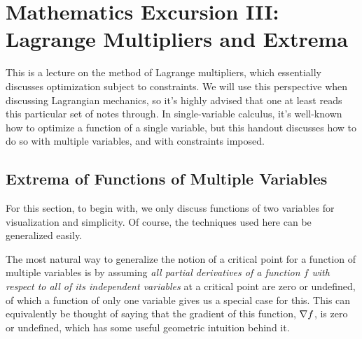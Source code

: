\section{Mathematics Excursion III: Lagrange Multipliers and Extrema}

This is a lecture on the method of Lagrange multipliers, which essentially discusses optimization subject to constraints. We will use this perspective when discussing Lagrangian mechanics, so it's highly advised that one at least reads this particular set of notes through. In single-variable calculus, it's well-known how to optimize a function of a single variable, but this handout discusses how to do so with multiple variables, and with constraints imposed. 

\subsection{Extrema of Functions of Multiple Variables}
For this section, to begin with, we only discuss functions of two variables for visualization and simplicity. Of course, the techniques used here can be generalized easily. 

The most natural way to generalize the notion of a critical point for a function of multiple variables is by assuming \textit{all partial derivatives of a function $f$ with respect to all of its independent variables} at a critical point are zero or undefined, of which a function of only one variable gives us  a special case for this. This can equivalently be thought of saying that the gradient of this function, $\nabla f$, is zero or undefined, which has some useful geometric intuition behind it. 

